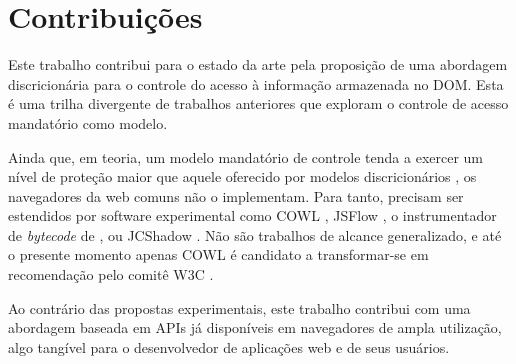 \section{Contribuições}

Este trabalho contribui para o estado da arte pela proposição de uma abordagem discricionária para o controle do acesso à informação armazenada no DOM. Esta é uma trilha divergente de trabalhos anteriores que exploram o controle de acesso mandatório como modelo.

Ainda que, em teoria, um modelo mandatório de controle tenda a exercer um nível de proteção maior que aquele oferecido por modelos discricionários \cite[p. 46]{CNSS2015} \cite[p. 4]{Foster1998}, os navegadores da web comuns não o implementam. Para tanto, precisam ser estendidos por software experimental como COWL \cite{Stefan2014}, JSFlow \cite{Hedin2016}, o instrumentador de \textit{bytecode} de \cite{Bichhawat2014}, ou JCShadow \cite{Patil2011}. Não são trabalhos de alcance generalizado, e até o presente momento apenas COWL é candidato a transformar-se em recomendação pelo comitê W3C \cite{W3C:COWL}.

Ao contrário das propostas experimentais, este trabalho contribui com uma abordagem baseada em APIs já disponíveis em navegadores de ampla utilização, algo tangível para o desenvolvedor de aplicações web e de seus usuários.

